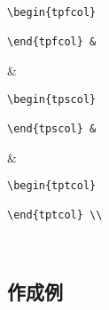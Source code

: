 \documentclass[paper=a4,fontsize=10.5pt]{jlreq}
\begin{document}
\begin{TeachingProcedures}
    \begin{tpfcol}
        \begin{verbatim}
\begin{tpfcol}
                    
\end{tpfcol} &
            \end{verbatim}
    \end{tpfcol}&
    \begin{tpscol}
        \begin{verbatim}
\begin{tpscol}
        
\end{tpscol} &
        \end{verbatim}
    \end{tpscol}&
    \begin{tptcol}
        \begin{verbatim}
\begin{tptcol}
    
\end{tptcol} \\
        \end{verbatim}
    \end{tptcol}\\
    \hline
\end{TeachingProcedures}
\newpage
\begin{leftbar}
    \section*{作成例}
\end{leftbar}
\end{document}
